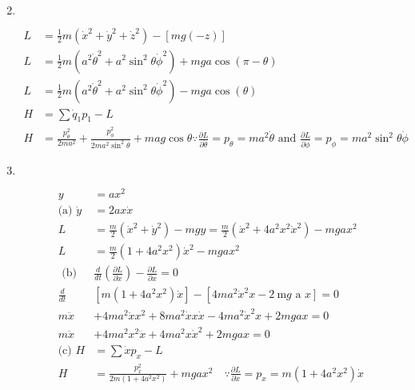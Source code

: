 \begin{enumerate}
\begin{answer}
\begin{align*}
		\end{align*}
	\end{answer}
	\item $\left. \right. $
	\begin{answer}
		\begin{align*}
		L&=\frac{1}{2} m\left(\dot{x}^{2}+\dot{y}^{2}+\dot{z}^{2}\right)-[m g(-z)]\\
		L&=\frac{1}{2} m\left(a^{2} \dot{\theta}^{2}+a^{2} \sin ^{2} \theta \dot{\phi}^{2}\right)+m g a \cos (\pi-\theta)\\
		L&=\frac{1}{2} m\left(a^{2} \dot{\theta}^{2}+a^{2} \sin ^{2} \theta \dot{\phi}^{2}\right)-m g a \cos (\theta)\\
		H&=\sum \dot{q}_{1} p_{1}-L\\
		H&=\frac{p_{\theta}^{2}}{2 m a^{2}}+\frac{p_{\phi}^{2}}{2 m a^{2} \sin ^{2} \theta}+m a g \cos \theta \because \frac{\partial L}{\partial \dot{\theta}}=p_{\theta}=m a^{2} \dot{\theta}\text{ and } \frac{\partial L}{\partial \dot{\phi}}=p_{\phi}=m a^{2} \sin ^{2} \theta \dot{\phi}
		\end{align*}
	\end{answer}
	\item $\left. \right. $
	\begin{answer}
		\begin{align*}
		y&=a x^{2}\\
		\text{(a) }\dot{y}&=2 a x \dot{x}\\
		L&=\frac{m}{2}\left(\dot{x}^{2}+\dot{y}^{2}\right)-m g y=\frac{m}{2}\left(\dot{x}^{2}+4 a^{2} x^{2} \dot{x}^{2}\right)-m g a x^{2}\\
		L&=\frac{m}{2}\left(1+4 a^{2} x^{2}\right) \dot{x}^{2}-m g a x^{2}\\
	\text{	(b) }&\frac{d}{d t}\left(\frac{\partial L}{\partial \dot{x}}\right)-\frac{\partial L}{\partial x}=0\\
	\frac{d}{d t}&\left[m\left(1+4 a^{2} x^{2}\right) \dot{x}\right]-\left[4 m a^{2} \dot{x}^{2} x-2 \mathrm{~m} g\right.\text{ a }\left.x\right]=0\\
	m \ddot{x}&+4 m a^{2} \ddot{x} x^{2}+8 m a^{2} \dot{x} x \dot{x}-4 m a^{2} \dot{x}^{2} x+2 m g a x=0\\
	m \ddot{x}&+4 m a^{2} x^{2} \ddot{x}+4 m a^{2} x \dot{x}^{2}+2 m g a x=0\\
	\text{(c) }H&=\sum \dot{x} p_{x}-L\\
	H&=\frac{p_{x}^{2}}{2 m\left(1+4 a^{2} x^{2}\right)}+m g a x^{2} \quad \because \frac{\partial L}{\partial \dot{x}}=p_{x}=m\left(1+4 a^{2} x^{2}\right) \dot{x}

\end{align*}
\end{answer}
\end{enumerate}
